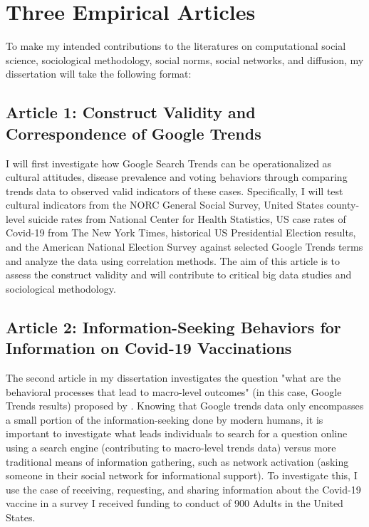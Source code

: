 \section{Three Empirical Articles}

To make my intended contributions to the literatures on computational
social science, sociological methodology, social norms, social networks,
and diffusion, my dissertation will take the following format:

\subsection{Article 1: Construct Validity and Correspondence of Google Trends}
I will first investigate how Google Search Trends can be operationalized
as cultural attitudes, disease prevalence and voting behaviors through
comparing trends data to observed valid indicators of these cases.
Specifically, I will test cultural indicators from the NORC General
Social Survey, United States county-level suicide rates from National
Center for Health Statistics, US case rates of Covid-19 from The New
York Times, historical US Presidential Election results, and the
American National Election Survey against selected Google Trends terms
and analyze the data using correlation methods. The aim of this article
is to assess the construct validity and will contribute to critical big
data studies and sociological methodology.

\subsection{Article 2: Information-Seeking Behaviors for Information on Covid-19 Vaccinations}
The second article in my dissertation investigates the question "what
are the behavioral processes that lead to macro-level outcomes" (in this
case, Google Trends results) proposed by \citet{breigerScaling2015}. Knowing that
Google trends data only encompasses a small portion of the
information-seeking done by modern humans, it is important to
investigate what leads individuals to search for a question online using
a search engine (contributing to macro-level trends data) versus more
traditional means of information gathering, such as network activation
(asking someone in their social network for informational support). To
investigate this, I use the case of receiving, requesting, and sharing
information about the Covid-19 vaccine in a survey I received funding to
conduct of 900 Adults in the United States.

